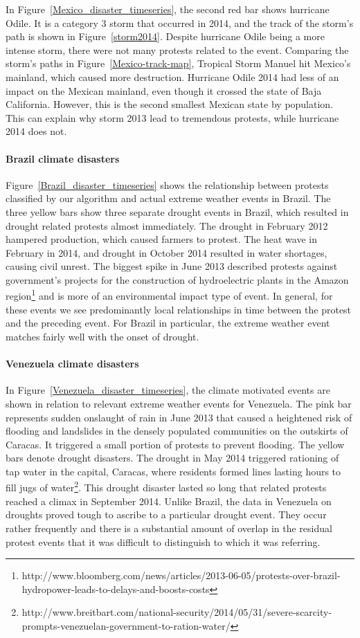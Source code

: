 In Figure~\ref{Mexico_disaster_timeseries}, the second red bar shows hurricane Odile.
It is a category 3 storm that occurred in 2014, and the track of the storm's path is shown in Figure~\ref{storm2014}.
Despite hurricane Odile being a more intense storm, there were not many protests related to the event.
Comparing the storm's paths in Figure~\ref{Mexico-track-map}, Tropical Storm Manuel hit Mexico's mainland, which caused more  destruction.
Hurricane Odile 2014 had less of an impact on the Mexican mainland, even though it crossed the state of Baja California. However, this is the second smallest Mexican state by population.
This can explain why storm 2013 lead to tremendous protests, while hurricane 2014 does not.


\paragraph{Brazil climate disasters}
Figure~\ref{Brazil_disaster_timeseries} shows the relationship between protests classified by our algorithm and actual extreme weather events in Brazil.
The three yellow bars show three separate drought events in Brazil, which resulted in drought related protests almost immediately.
The drought in February 2012 hampered production, which caused farmers to protest.
The heat wave in February in 2014, and drought in October 2014 resulted in water shortages, causing civil unrest.
The biggest spike in June 2013 described protests against government's projects for the construction of hydroelectric plants in the Amazon region\footnote{http://www.bloomberg.com/news/articles/2013-06-05/protests-over-brazil-hydropower-leads-to-delays-and-boosts-costs} and is more of an environmental impact type of event.
In general, for these events we see predominantly local relationships in time between the protest and the preceding event.
For Brazil in particular, the extreme weather event matches fairly well with the onset of drought.


\paragraph{Venezuela climate disasters}
In Figure~\ref{Venezuela_disaster_timeseries}, the climate motivated events are shown in relation to relevant extreme weather events for Venezuela.
The pink bar represents sudden onslaught of rain in June 2013 that caused a heightened risk of flooding and landslides in the densely populated communities on the outskirts of Caracas.
It triggered a small portion of protests to prevent flooding.
The yellow bars denote drought disasters.
The drought in May 2014 triggered rationing of tap water in the capital, Caracas, where residents formed lines lasting hours to fill jugs of water\footnote{http://www.breitbart.com/national-security/2014/05/31/severe-scarcity-prompts-venezuelan-government-to-ration-water/}.
This drought disaster lasted so long that related protests reached a climax in September 2014.
Unlike Brazil, the data in Venezuela on droughts proved tough to ascribe to a particular drought event.
They occur rather frequently and there is a substantial amount of overlap in the residual protest events that it was difficult to distinguish to which it was referring.


